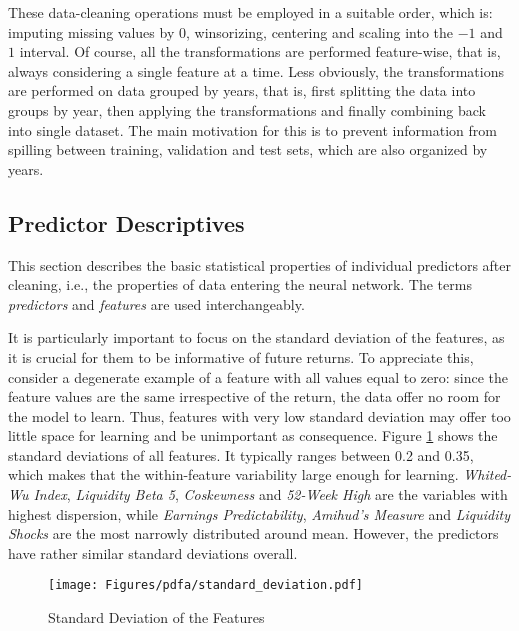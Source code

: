 		These data-cleaning operations must be employed in a suitable order, which is: imputing missing values by $0$, winsorizing, centering and scaling into the $-1$ and $1$ interval. Of course, all the transformations are performed feature-wise, that is, always considering a single feature at a time. Less obviously, the transformations are performed on data grouped by years, that is, first splitting the data into groups by year, then applying the transformations and finally combining back into single dataset. The main motivation for this is to prevent information from spilling between training, validation and test sets, which are also organized by years. 

	\subsection{Predictor Descriptives}   	
		This section describes the basic statistical properties of individual predictors after cleaning, i.e., the properties of data entering the neural network. The terms \textit{predictors} and \textit{features} are used interchangeably. 
		
		It is particularly important to focus on the standard deviation of the features, as it is crucial for them to be informative of future returns. To appreciate this, consider a degenerate example of a feature with all values equal to zero: since the feature values are the same irrespective of the return, the data offer no room for the model to learn. Thus, features with very low standard deviation may offer too little space for learning and be unimportant as consequence. Figure \ref{fig:standard_deviation} shows the standard deviations of all features. It typically ranges between 0.2 and 0.35, which makes that the within-feature variability large enough for learning. \textit{Whited-Wu Index}, \textit{Liquidity Beta 5}, \textit{Coskewness} and \textit{52-Week High} are the variables with highest dispersion, while \textit{Earnings Predictability},\textit{ Amihud's Measure} and\textit{ Liquidity Shocks} are the most narrowly distributed around mean. However, the predictors have rather similar standard deviations overall.
		\begin{center}
			\begin{figure}[htb]
				\texttt{[image: Figures/pdfa/standard\_deviation.pdf]}
				\caption{Standard Deviation of the Features}
				\label{fig:standard_deviation}
			\end{figure}
		\end{center}
		
